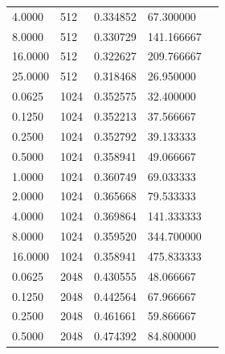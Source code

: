 \documentclass[]{article}
\begin{document}
\begin{table}[]
\begin{tabular}{lllll}
4.0000  &  512 & 0.334852 &  67.300000  \\                                                                            
8.0000  &  512 & 0.330729 & 141.166667  \\                                                                            
16.0000 &  512 & 0.322627 & 209.766667  \\                                                                            
25.0000 &  512 & 0.318468 &  26.950000  \\                                                                            
0.0625  & 1024 & 0.352575 &  32.400000  \\                                                                            
0.1250  & 1024 & 0.352213 &  37.566667  \\                                                                            
0.2500  & 1024 & 0.352792 &  39.133333  \\                                                                            
0.5000  & 1024 & 0.358941 &  49.066667  \\                                                                            
1.0000  & 1024 & 0.360749 &  69.033333  \\                                                                            
2.0000  & 1024 & 0.365668 &  79.533333  \\                                                                            
4.0000  & 1024 & 0.369864 & 141.333333  \\                                                                            
8.0000  & 1024 & 0.359520 & 344.700000  \\                                                                            
16.0000 & 1024 & 0.358941 & 475.833333  \\                                                                            
0.0625  & 2048 & 0.430555 &  48.066667  \\                                                                            
0.1250  & 2048 & 0.442564 &  67.966667  \\                                                                            
0.2500  & 2048 & 0.461661 &  59.866667  \\                                                                            
0.5000  & 2048 & 0.474392 &  84.800000  \\                                                                            

\end{tabular}
\end{table}
\end{document}
